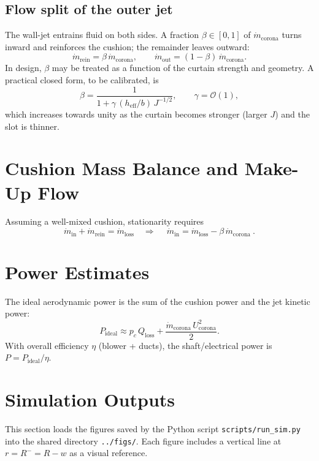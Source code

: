 \documentclass[11pt,a4paper]{article}
\begin{document}
\subsection*{Flow split of the outer jet}
The wall-jet entrains fluid on both sides.
A fraction $\beta\in[0,1]$ of $\dot m_{\mathrm{corona}}$ turns inward and reinforces the cushion; the remainder leaves outward:
\begin{equation}
  \dot m_{\mathrm{rein}}=\beta\,\dot m_{\mathrm{corona}},\qquad
  \dot m_{\mathrm{out}}=(1-\beta)\,\dot m_{\mathrm{corona}}.
  \label{eq:split}
\end{equation}
In design, $\beta$ may be treated as a function of the curtain strength and geometry.
A practical closed form, to be calibrated, is
\begin{equation}
  \beta = \frac{1}{1+\gamma\,(h_{\mathrm{eff}}/b)\,J^{-1/2}},\qquad \gamma=\mathcal{O}(1),
  \label{eq:beta}
\end{equation}
which increases towards unity as the curtain becomes stronger (larger $J$) and the slot is thinner.

\section{Cushion Mass Balance and Make-Up Flow}
Assuming a well-mixed cushion, stationarity requires
\begin{equation}
  \dot m_{\mathrm{in}} + \dot m_{\mathrm{rein}} = \dot m_{\mathrm{loss}}
  \quad \Rightarrow \quad
  \boxed{\ \dot m_{\mathrm{in}} = \dot m_{\mathrm{loss}} - \beta\,\dot m_{\mathrm{corona}}\ }.
  \label{eq:massbalance}
\end{equation}

\section{Power Estimates}
The ideal aerodynamic power is the sum of the cushion power and the jet kinetic power:
\begin{equation}
  P_{\mathrm{ideal}} \approx p_c\,Q_{\mathrm{loss}} + \frac{\dot m_{\mathrm{corona}}\,U_{\mathrm{corona}}^{2}}{2}.
  \label{eq:power}
\end{equation}
With overall efficiency $\eta$ (blower + ducts), the shaft/electrical power is $P=P_{\mathrm{ideal}}/\eta$.

\section{Simulation Outputs}
This section loads the figures saved by the Python script \texttt{scripts/run\_sim.py} into the shared directory \texttt{../figs/}.
Each figure includes a vertical line at $r=R^-=R-w$ as a visual reference.
\end{document}
